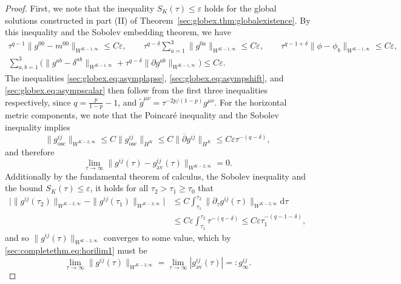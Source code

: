 \documentclass{article}
\newcommand{\osc}{\mathrm{osc}}
\newcommand{\av}{\mathrm{av}}
\newcommand{\de}{\mathrm{d}}
\newcommand{\ol}{\overline}
\newcommand{\wt}{\widetilde}
\newcommand{\ve}{\varepsilon}
\newcommand{\pa}{\partial}
\newcommand{\ra}{\rightarrow}
\begin{document}
\begin{proof}
    First, we note that the inequality $S_K(\tau) \leq \ve$ holds for the global solutions constructed in part (II) of Theorem~\ref{sec:globex.thm:globalexistence}. By this inequality and the Sobolev embedding theorem, we have
    \begin{gather}
        \tau^{q-1}\|g^{00} - m^{00}\|_{W^{K-1,\infty}} \leq C\ve,\qquad 
        \tau^{q-\delta}\sum_{a=1}^3 \|g^{0a}\|_{W^{K-1,\infty}} \leq C\ve,\qquad 
        \tau^{q-1+\delta}\|\phi - \phi_b\|_{W^{K-1,\infty}}\leq C\ve,\\
        \sum_{a,b=1}^3 \Big(\|g^{ab} - \delta^{ab}\|_{W^{K-1,\infty}}  + \tau^{q-\delta}\|\pa g^{ab}\|_{W^{K-1,\infty}} \Big)\leq C\ve.\label{sec:completethm.eq:horibound}
    \end{gather}
    The inequalities \eqref{sec:globex.eq:asymplapse}, \eqref{sec:globex.eq:asympshift}, and \eqref{sec:globex.eq:asympscalar} then follow  from the first three inequalities respectively, since $q = \frac{p}{1-p}-1$, and $\wt{g}^{\mu\nu} = \tau^{-2p/(1-p)}g^{\mu\nu}$. For the horizontal metric components, we note that the Poincar\'e inequality and the Sobolev inequality implies
    \begin{equation}
        \|g_{\osc}^{ij}\|_{W^{K-2,\infty}} \leq C\|g_\osc^{ij}\|_{H^K} \leq C\|\ol{\pa} g^{ij}\|_{H^K} \leq C\ve \tau^{-(q-\delta)}, 
    \end{equation}
    and therefore
    \begin{equation}\label{sec:completethm.eq:horilim1}
        \lim_{\tau \ra \infty}\|g^{ij}(\tau) - g_{\av}^{ij}(\tau)\|_{W^{K-2,\infty}} = 0.
    \end{equation}
    Additionally by the fundamental theorem of calculus, the Sobolev inequality and the bound $S_K(\tau) \leq \ve$, it holds for all $\tau_2 > \tau_1 \geq \tau_0$ that
    \begin{align}
        \big|\|g^{ij}(\tau_2)\|_{W^{K-2,\infty}} - \|g^{ij}(\tau_1)\|_{W^{K-2,\infty}}\big| &\leq C\int_{\tau_1}^{\tau_2}\|\pa_\tau g^{ij}(\tau)\|_{W^{K-2,\infty}}\de \tau\nonumber\\
        &\leq C\ve\int_{\tau_1}^{\tau_2}\tau^{-(q-\delta)} \leq C\ve\tau_1^{-(q-1-\delta)},
    \end{align}
    and so $\|g^{ij}(\tau)\|_{W^{K-2,\infty}}$ converges to some value, which by \eqref{sec:completethm.eq:horilim1} must be 
    \begin{equation}
        \lim_{\tau\ra\infty}\|g^{ij}(\tau)\|_{W^{K-2,\infty}} = \lim_{\tau \ra \infty}|g_\av^{ij}(\tau)| =: g_\infty^{ij}.

\end{equation}
\end{proof}
\end{document}
